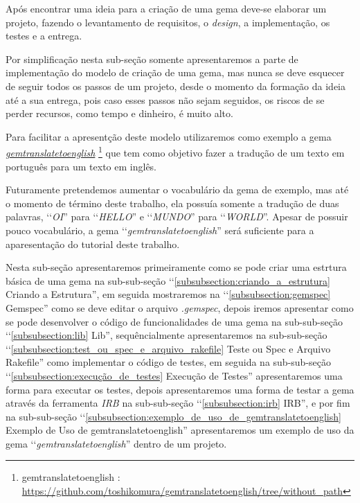 Após encontrar uma ideia para a criação de uma gema deve-se elaborar um projeto, fazendo o levantamento 
de requisitos, o \emph{design}, a implementação, os testes e a entrega.

Por simplificação nesta sub-seção somente apresentaremos a parte de implementação do modelo de criação de uma
gema, mas nunca se deve esquecer de seguir todos os passos de um projeto, desde o momento da formação da 
ideia até a sua entrega, pois caso esses passos não sejam seguidos, os riscos de se 
perder recursos, como tempo e dinheiro, é muito alto.

Para facilitar a apresentção deste modelo utilizaremos como exemplo a gema 
\emph{\href{https://github.com/toshikomura/gemtranslatetoenglish/tree/without_path}{gemtranslatetoenglish}} 
\footnote{gemtranslatetoenglish : \url{https://github.com/toshikomura/gemtranslatetoenglish/tree/without_path}} que tem 
como objetivo fazer a tradução de um texto em português para um texto em inglês. 

Futuramente pretendemos aumentar o vocabulário da gema de exemplo, mas até o momento de término deste 
trabalho, ela possuía somente a tradução de duas palavras, ‘‘\emph{OI}'' para ‘‘\emph{HELLO}'' e 
‘‘\emph{MUNDO}'' para ‘‘\emph{WORLD}''. Apesar de possuir pouco vocabulário, a gema ‘‘\emph{gemtranslatetoenglish}''
será suficiente para a aparesentação do tutorial deste trabalho. 

Nesta sub-seção apresentaremos primeiramente como se pode criar uma estrtura básica de uma gema na sub-sub-seção 
‘‘\ref{subsubsection:criando_a_estrutura} Criando a Estrutura'', em seguida mostraremos na 
‘‘\ref{subsubsection:gemspec} Gemspec'' como se deve editar o arquivo \emph{.gemspec}, depois iremos apresentar 
como se pode desenvolver o código de funcionalidades de uma gema na sub-sub-seção ‘‘\ref{subsubsection:lib} Lib'', 
sequêncialmente apresentaremos na sub-sub-seção ‘‘\ref{subsubsection:test_ou_spec_e_arquivo_rakefile} Teste ou Spec e 
Arquivo Rakefile'' como implementar o código de testes, em seguida na sub-sub-seção 
‘‘\ref{subsubsection:execução_de_testes} Execução de Testes'' apresentaremos uma forma para executar os testes, 
depois apresentaremos uma forma de testar a gema através da ferramenta \emph{IRB} na sub-sub-seção 
‘‘\ref{subsubsection:irb} IRB'', e por fim na sub-sub-seção ‘‘\ref{subsubsection:exemplo_de_uso_de_gemtranslatetoenglish} 
Exemplo de Uso de gemtranslatetoenglish'' apresentaremos um exemplo de uso da gema 
‘‘\emph{gemtranslatetoenglish}'' dentro de um projeto.

